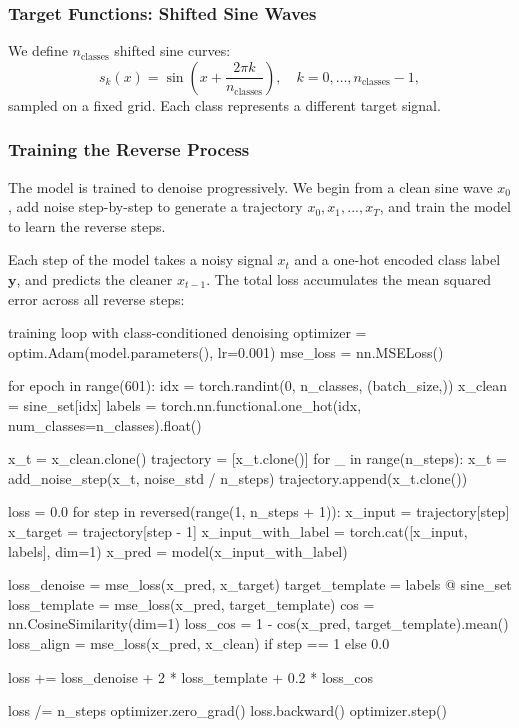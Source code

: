 \subsubsection*{Target Functions: Shifted Sine Waves}

We define \( n_\text{classes} \) shifted sine curves:
\[
s_k(x) = \sin\left(x + \frac{2\pi k}{n_\text{classes}}\right), \quad k = 0, \dots, n_\text{classes} - 1,
\]
sampled on a fixed grid. Each class represents a different target signal.

\subsubsection*{Training the Reverse Process}

The model is trained to denoise progressively. We begin from a clean sine wave \( x_0 \), add noise step-by-step to generate a trajectory \( x_0, x_1, ..., x_T \), and train the model to learn the reverse steps.

Each step of the model takes a noisy signal \( x_t \) and a one-hot encoded class label \( \mathbf{y} \), and predicts the cleaner \( x_{t-1} \). The total loss accumulates the mean squared error across all reverse steps:

\begin{codeonly}{training loop with class-conditioned denoising}
optimizer = optim.Adam(model.parameters(), lr=0.001)
mse_loss = nn.MSELoss()

for epoch in range(601):
    idx = torch.randint(0, n_classes, (batch_size,))
    x_clean = sine_set[idx]
    labels = torch.nn.functional.one_hot(idx, num_classes=n_classes).float()

    x_t = x_clean.clone()
    trajectory = [x_t.clone()]
    for _ in range(n_steps):
        x_t = add_noise_step(x_t, noise_std / n_steps)
        trajectory.append(x_t.clone())

    loss = 0.0
    for step in reversed(range(1, n_steps + 1)):
        x_input = trajectory[step]
        x_target = trajectory[step - 1]
        x_input_with_label = torch.cat([x_input, labels], dim=1)
        x_pred = model(x_input_with_label)

        loss_denoise = mse_loss(x_pred, x_target)
        target_template = labels @ sine_set
        loss_template = mse_loss(x_pred, target_template)
        cos = nn.CosineSimilarity(dim=1)
        loss_cos = 1 - cos(x_pred, target_template).mean()
        loss_align = mse_loss(x_pred, x_clean) if step == 1 else 0.0

        loss += loss_denoise + 2 * loss_template + 0.2 * loss_cos

    loss /= n_steps
    optimizer.zero_grad()
    loss.backward()
    optimizer.step()
\end{codeonly}


